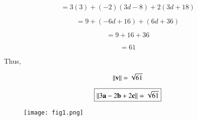 \documentclass[journal]{IEEEtran}
\begin{document}
\begin{equation}
= 3(3) + (-2)(3d - 8) + 2(3d + 18)
\end{equation}

\begin{equation}
= 9 + (-6d + 16) + (6d + 36)
\end{equation}

\begin{equation}
= 9 + 16 + 36
\end{equation}

\begin{equation}
= 61
\end{equation}

Thus,

\begin{equation}
\left\lVert\mathbf{v}\right\rVert = \sqrt{61}
\end{equation}


\begin{equation}
\boxed{\left\lVert3\mathbf{a} - 2\mathbf{b} + 2\mathbf{c}\right\rVert = \sqrt{61}}
\end{equation}


\begin{figure}[h!]
   \centering
   \texttt{[image: fig1.png]}
   \caption{}
   \label{stemplot}
\end{figure}
\end{document}
